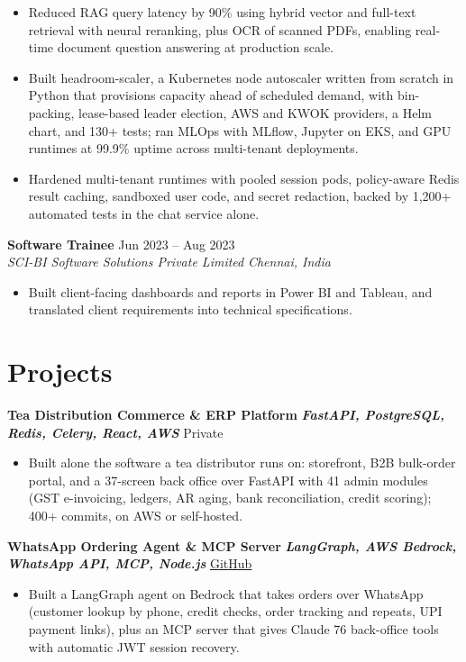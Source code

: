 \documentclass[10pt,letterpaper]{article}
\newcommand{\resumeRole}[4]{
  \textbf{#1} \hfill #2 \\
  \textit{#3} \hfill \textit{#4}
}
\newcommand{\resumeProject}[3]{
  \textbf{#1} \textbar{} \textbf{\textit{#2}} \hfill #3
}
\begin{document}
\begin{itemize}
  \item Reduced RAG query latency by 90\% using hybrid vector and full-text retrieval with neural reranking, plus OCR of scanned PDFs, enabling real-time document question answering at production scale.
  \item Built headroom-scaler, a Kubernetes node autoscaler written from scratch in Python that provisions capacity ahead of scheduled demand, with bin-packing, lease-based leader election, AWS and KWOK providers, a Helm chart, and 130+ tests; ran MLOps with MLflow, Jupyter on EKS, and GPU runtimes at 99.9\% uptime across multi-tenant deployments.
  \item Hardened multi-tenant runtimes with pooled session pods, policy-aware Redis result caching, sandboxed user code, and secret redaction, backed by 1,200+ automated tests in the chat service alone.
\end{itemize}

\resumeRole{Software Trainee}{Jun 2023 -- Aug 2023}{SCI-BI Software Solutions Private Limited}{Chennai, India}
\begin{itemize}
  \item Built client-facing dashboards and reports in Power BI and Tableau, and translated client requirements into technical specifications.
\end{itemize}

\section*{Projects}
\resumeProject{Tea Distribution Commerce \& ERP Platform}{FastAPI, PostgreSQL, Redis, Celery, React, AWS}{Private}
\begin{itemize}
  \item Built alone the software a tea distributor runs on: storefront, B2B bulk-order portal, and a 37-screen back office over FastAPI with 41 admin modules (GST e-invoicing, ledgers, AR aging, bank reconciliation, credit scoring); 400+ commits, on AWS or self-hosted.
\end{itemize}

\resumeProject{WhatsApp Ordering Agent \& MCP Server}{LangGraph, AWS Bedrock, WhatsApp API, MCP, Node.js}{\href{https://github.com/Sarvesh-GanesanW/sre-tea-mcp}{GitHub}}
\begin{itemize}
  \item Built a LangGraph agent on Bedrock that takes orders over WhatsApp (customer lookup by phone, credit checks, order tracking and repeats, UPI payment links), plus an MCP server that gives Claude 76 back-office tools with automatic JWT session recovery.
\end{itemize}
\end{document}
